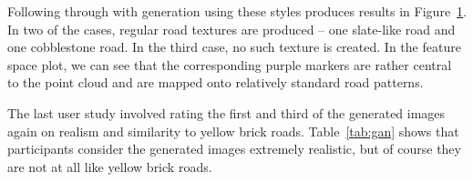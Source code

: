 \documentclass[10pt,twocolumn,letterpaper]{article}
\begin{document}
\begin{figure}
{	}


	\caption{}
	\label{fig:gan}
\end{figure}

Following through with generation using these styles produces results in Figure~\ref{fig:gan}. In two of the cases, regular road textures are produced -- one slate-like road and one cobblestone road. In the third case, no such texture is created. In the feature space plot, we can see that the corresponding purple markers are rather central to the point cloud and are mapped onto relatively standard road patterns.

The last user study involved rating the first and third of the generated images again on realism and similarity to yellow brick roads. Table~\ref{tab:gan} shows that participants consider the generated images extremely realistic, but of course they are not at all like yellow brick roads.
\end{document}
